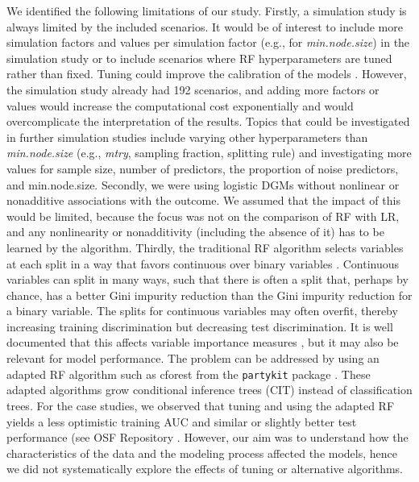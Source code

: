We identified the following limitations of our study. Firstly, a simulation
study is always limited by the included scenarios. It would be of interest to
include more simulation factors and values per simulation factor (e.g., for
\textit{min.node.size}) in the simulation study or to include scenarios where \gls{RF}
hyperparameters are tuned rather than fixed. Tuning could improve the
calibration of the models
 \cite{probstHyperparametersTuningStrategies2019,kruppaProbabilityEstimationMachine2014a}.
However, the simulation study already had 192 scenarios, and adding more factors
or values would increase the computational cost exponentially and would
overcomplicate the interpretation of the results. Topics that could be
investigated in further simulation studies include varying other hyperparameters
than \textit{min.node.size} (e.g., \textit{mtry}, sampling fraction, splitting
rule) and investigating more values for sample size, number of predictors, the
proportion of noise predictors, and min.node.size. Secondly, we were using
logistic \glspl{DGM} without nonlinear or nonadditive associations with the outcome. We
assumed that the impact of this would be limited, because the focus was not on
the comparison of \gls{RF} with \gls{LR}, and any nonlinearity or nonadditivity (including
the absence of it) has to be learned by the algorithm. Thirdly, the traditional
\gls{RF} algorithm selects variables at each split in a way that favors continuous
over binary variables \cite{stroblBiasRandomForest2007}. Continuous variables
can split in many ways, such that there is often a split that, perhaps by
chance, has a better Gini impurity reduction than the Gini impurity reduction
for a binary variable. The splits for continuous variables may often overfit,
thereby increasing training discrimination but decreasing test discrimination.
It is well documented that this affects variable importance measures
 \cite{stroblBiasRandomForest2007}, but it may also be relevant for model
performance. The problem can be addressed by using an adapted \gls{RF} algorithm such
as cforest from the \texttt{partykit} package
 \cite{hothornUnbiasedRecursivePartitioning2006}. These adapted algorithms grow
conditional inference trees (\gls{CIT}) instead of classification trees. For the case
studies, we observed that tuning and using the adapted \gls{RF} yields a less
optimistic training \gls{AUC} and similar or slightly better test performance (see \gls{OSF}
Repository \cite{barrenadaUnderstandingOverfittingRandom2023}. However, our aim was to understand
how the characteristics of the data and the modeling process affected the
models, hence we did not systematically explore the effects of tuning or
alternative algorithms.

